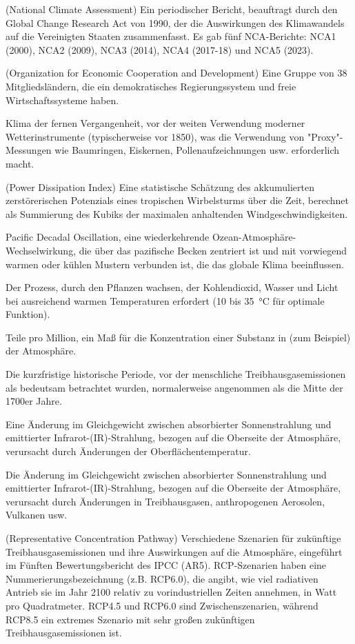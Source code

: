 \documentclass[12pt,paper=a4,DIV=12,parskip=never,chapterprefix=false,headings=standardclasses]{scrreprt}
\begin{document}
\begin{glossar}
\item[NCA] (National Climate Assessment) Ein periodischer Bericht, beauftragt durch den Global Change Research Act von 1990, der die Auswirkungen des Klimawandels auf die Vereinigten Staaten zusammenfasst. Es gab fünf NCA-Berichte: NCA1 (2000), NCA2 (2009), NCA3 (2014), NCA4 (2017-18) und NCA5 (2023).
\item[OECD] (Organization for Economic Cooperation and Development) Eine Gruppe von 38 Mitgliedsländern, die ein demokratisches Regierungssystem und freie Wirtschaftssysteme haben.
\item[PALÄOKLIMA] Klima der fernen Vergangenheit, vor der weiten Verwendung moderner Wetterinstrumente (typischerweise vor 1850), was die Verwendung von "Proxy"-Messungen wie Baumringen, Eiskernen, Pollenaufzeichnungen usw. erforderlich macht.
\item[PDI] (Power Dissipation Index) Eine statistische Schätzung des akkumulierten zerstörerischen Potenzials eines tropischen Wirbelsturms über die Zeit, berechnet als Summierung des Kubiks der maximalen anhaltenden Windgeschwindigkeiten.
\item[PDO] Pacific Decadal Oscillation, eine wiederkehrende Ozean-Atmosphäre-Wechselwirkung, die über das pazifische Becken zentriert ist und mit vorwiegend warmen oder kühlen Mustern verbunden ist, die das globale Klima beeinflussen.
\item[PHOTOSYNTHESE] Der Prozess, durch den Pflanzen wachsen, der Kohlendioxid, Wasser und Licht bei ausreichend warmen Temperaturen erfordert (10 bis \SI{35}{\celsius} für optimale Funktion).
\item[PPM] Teile pro Million, ein Maß für die Konzentration einer Substanz in (zum Beispiel) der Atmosphäre.
\item[VORINDUSTRIELL] Die kurzfristige historische Periode, vor der menschliche Treibhausgasemissionen als bedeutsam betrachtet wurden, normalerweise angenommen als die Mitte der 1700er Jahre.
\item[RADIATIVES FEEDBACK] Eine Änderung im Gleichgewicht zwischen absorbierter Sonnenstrahlung und emittierter Infrarot-(IR)-Strahlung, bezogen auf die Oberseite der Atmosphäre, verursacht durch Änderungen der Oberflächentemperatur.
\item[RADIATIVER ANTRIEB] Die Änderung im Gleichgewicht zwischen absorbierter Sonnenstrahlung und emittierter Infrarot-(IR)-Strahlung, bezogen auf die Oberseite der Atmosphäre, verursacht durch Änderungen in Treibhausgasen, anthropogenen Aerosolen, Vulkanen usw.
\item[RCP-SZENARIEN] (Representative Concentration Pathway) Verschiedene Szenarien für zukünftige Treibhausgasemissionen und ihre Auswirkungen auf die Atmosphäre, eingeführt im Fünften Bewertungsbericht des IPCC (AR5). RCP-Szenarien haben eine Nummerierungsbezeichnung (z.B. RCP6.0), die angibt, wie viel radiativen Antrieb sie im Jahr 2100 relativ zu vorindustriellen Zeiten annehmen, in Watt pro Quadratmeter. RCP4.5 und RCP6.0 sind Zwischenszenarien, während RCP8.5 ein extremes Szenario mit sehr großen zukünftigen Treibhausgasemissionen ist.

\end{glossar}
\end{document}
